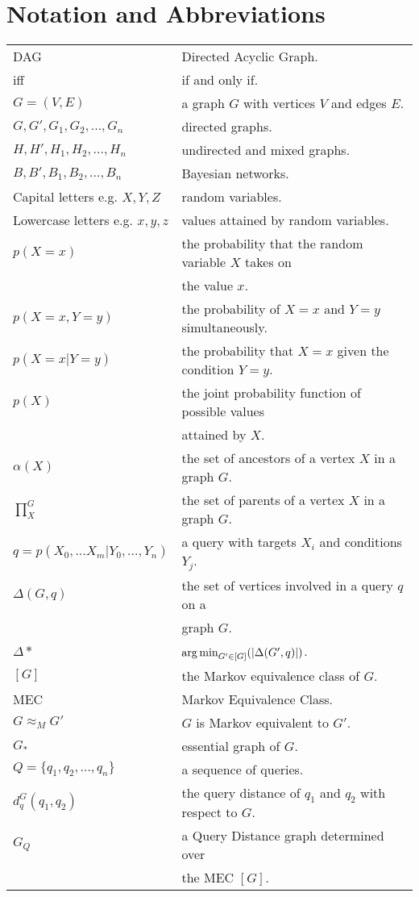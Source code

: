\section*{Notation and Abbreviations}

\begin{table}[h!]
  \begin{center}
      \begin{spacing}{1.4}
    \begin{tabular}{  l  l }

      \hline
	
	 DAG & Directed Acyclic Graph. \\
	 iff & if and only if. \\
	 $G = (V,E)$ & a graph $G$ with vertices $V$ and edges $E$. \\
	 $G, G', G_{1}, G_{2}, ..., G_{n}$ & directed graphs. \\ 
	$H, H', H_{1}, H_{2}, ..., H_{n}$ & undirected and mixed graphs. \\ 
	$B, B', B_{1}, B_{2}, ..., B_{n}$ &  Bayesian networks. \\
	Capital letters e.g. $X,Y,Z$ & random variables.\\
	Lowercase letters e.g. $x,y,z$ & values attained by random variables. \\
	$p(X=x)$ & the probability that the random variable $X$ takes on \\ 
		& the value $x$. \\ 
	$p(X=x,Y=y)$ & the probability of $X=x$ and $Y=y$ simultaneously. \\
	$p(X=x|Y=y)$ & the probability that $X=x$ given the condition $Y=y$. \\
	$p(X)$ & the joint probability function of possible values \\ 
		&attained by $X$. \\
	$\alpha(X)$ & the set of ancestors of a vertex $X$ in a graph $G$.\\
	$\prod\nolimits_{X}^{G}$ & the set of parents of a vertex $X$ in a graph $G$.\\
	$q = p(X_{0}, ...X_{m}|Y_{0}, ..., Y_{n})$ & a query with targets $X_{i}$ and conditions $Y_{j}$. \\
	$\Delta(G,q)$ & the set of vertices involved in a query $q$ on a \\ 
		& graph $G$.\\
	$\Delta*$ & $\operatorname*{arg\,min}_{G' \in [G]} (|\Delta(G',q)|)$. \\
	$[G]$ & the Markov equivalence class of $G$. \\ 
	MEC &  Markov Equivalence Class. \\ 
	$G \approx_{M} G'$ & $G$ is Markov equivalent to $G'$.\\
	$G_{*}$ & essential graph of $G$. \\ 
	$Q=\{q_{1}, q_{2}, ..., q_{n}\}$ & a sequence of queries. \\
	$d_{q}^{G}(q_{1},q_{2})$ & the query distance of $q_{1}$ and $q_{2}$ with respect to $G$. \\
	$G_{Q}$ & a Query Distance graph determined over \\ 
		& the MEC $[G]$. \\


\end{tabular}
\end{spacing}
\end{center}
\end{table}
